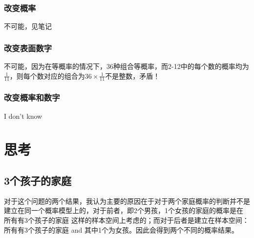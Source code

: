 \documentclass[12pt, a4paper]{article}
\begin{document}
\subsubsection{改变概率}
不可能，见笔记
\subsubsection{改变表面数字}
不可能，因为在等概率的情况下，36种组合等概率，而2-12中的每个数的概率均为$\frac{1}{11}$，则每个数对应的组合为$36\times \frac{1}{11}$不是整数，矛盾！
\subsubsection{改变概率和数字}
I don't know

\section{思考}
\subsection{3个孩子的家庭}
对于这个问题的两个结果，我认为主要的原因在于对于两个家庭概率的判断并不是建立在同一个概率模型上的，对于前者，即2个男孩，1个女孩的家庭的概率是在 {所有有3个孩子的家庭} 这样的样本空间上考虑的；而对于后者是建立在样本空间：{所有有3个孩子的家庭 and 其中1个为女孩}。因此会得到两个不同的概率结果。
\end{document}
